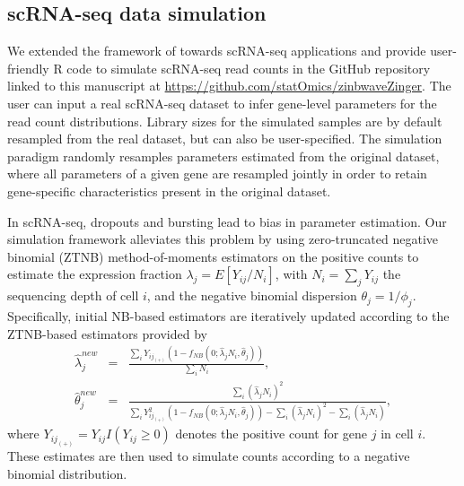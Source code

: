 \documentclass{bmcart}
\newcommand{\RObj}[1]{\texttt{#1}}
\newcommand{\koen}[1]{\textcolor{olive}{*** KVdB: #1}}
\begin{document}
\subsection*{scRNA-seq data simulation}

We extended the framework of \citet{Zhou2014} towards scRNA-seq applications and provide user-friendly R code to simulate scRNA-seq read counts in the GitHub repository linked to this manuscript at \url{https://github.com/statOmics/zinbwaveZinger}.
The user can input a real scRNA-seq dataset to infer gene-level parameters for the read count distributions. Library sizes for the simulated samples are by default resampled from the real dataset, but can also be user-specified. The simulation paradigm randomly resamples parameters estimated from the original dataset, where all parameters of a given gene are resampled jointly in order to retain gene-specific characteristics present in the original dataset.


In scRNA-seq, dropouts and bursting lead to bias in parameter estimation.
Our simulation framework alleviates this problem by using zero-truncated negative binomial (ZTNB) method-of-moments estimators \citep{Moore1986, McCullagh1989} on the positive counts to estimate the expression fraction $\lambda_j = E[Y_{ij}/N_i]$, with $N_i = \sum_j Y_{ij}$ the sequencing depth of cell $i$, and the negative binomial dispersion $\theta_j = 1/\phi_j$.
Specifically, initial NB-based estimators are iteratively updated according to the ZTNB-based estimators provided by
\begin{eqnarray} 
\hat\lambda_{j}^{new} &=& \frac{ \sum_i Y_{ij_{(+)}} \left ( 1-f_{NB}(0 ; \hat \lambda_j N_i, \hat \theta_j) \right )}{\sum_i N_i},\\
\hat\theta_j^{new} &=& \frac{\sum_{i}(\hat\lambda_j N_i)^2}{\sum_i Y_{ij_{(+)}}^2 \left ( 1-f_{NB}(0; \hat\lambda_j N_i, \hat\theta_j) \right) - \sum_{i} (\hat\lambda_j N_i)^2 - \sum_i (\hat\lambda_j N_i)}, \nonumber
\end{eqnarray}
where $Y_{ij_{(+)}} = Y_{ij}I(Y_{ij} \geq 0)$ denotes the positive count for gene $j$ in cell $i$.
These estimates are then used to simulate counts according to a negative binomial distribution. 
\end{document}
